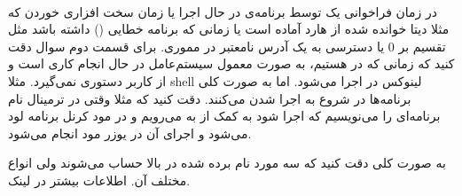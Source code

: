 \\
در زمان فراخوانی یک
توسط برنامه‌ی در حال اجرا یا زمان
سخت افزاری خوردن
که مثلا دیتا خوانده شده از هارد آماده است یا زمانی که برنامه خطایی
()
داشته باشد مثل تقسیم بر 0 یا دسترسی به یک آدرس نامعتبر در مموری.
برای قسمت دوم سوال دقت کنید که زمانی که در
هستیم، به صورت معمول سیستم‌عامل در حال انجام کاری است و از کاربر دستوری نمی‌گیرد. مثلا
shell
لینوکس در
اجرا می‌شود. اما به صورت کلی برنامه‌ها در
شروع به اجرا شدن می‌کنند. دقت کنید که مثلا وقتی در ترمینال نام برنامه‌ای را می‌نویسیم که اجرا شود به کمک
از
به
می‌رویم و در مود کرنل برنامه لود می‌شود و اجرای آن در یوزر مود انجام می‌شود.

\noindent
به صورت کلی دقت کنید که سه مورد نام برده شده در بالا
حساب می‌شوند ولی انواع مختلف آن.
اطلاعات بیشتر در
لینک.